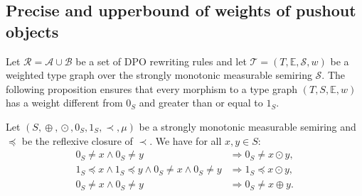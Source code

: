 \subsection{Precise and upperbound of weights of pushout objects}
Let \( \mathcal{R} \mathop{=} \mathcal{A} \mathop{\cup} \mathcal{B} \) be a set of DPO rewriting rules and let \(\mathcal{T} \mathop{=} (T, \mathbb{E}, \mathcal{S}, w)\) be a weighted type graph over the strongly monotonic measurable semiring $\mathcal{S}$.
The following proposition ensures that every morphism to a type graph $(T,S,\mathbb{E}, w)$ has a weight different from $0_S$ and greater than or equal to $1_S$.
\begin{proposition}  
    \label{prop_endrullis_2d7}
    Let $(S, \mathop{\oplus}, \mathop{\odot}, 0_S, 1_S, \prec, \mu)$ be a strongly monotonic measurable semiring and $\mathop{\preceq}$ be the reflexive closure of $\prec$. We have for all $x,y\in S$:
    \begin{align*}
        0_S \mathop{\neq} x \mathop{\land} 0_S \mathop{\neq} y 
        &\mathop{\Rightarrow} 0_S \mathop{\neq} x \mathop{\odot} y,
        \tag{S10} \label{eq:prop_neq0_mul_neq0}  
        \\
        1_S \mathop{\preceq} x \mathop{\land} 1_S \mathop{\preceq} y \mathop{\land} 0_S \mathop{\neq} x \mathop{\land} 0_S \mathop{\neq} y  
        &\mathop{\Rightarrow}
         1_S \mathop{\preceq} x \mathop{\odot} y,
         \tag{S11} \label{eq:prop_neg0_ge1_mul_ge1}  
         \\
         0_S \mathop{\neq} x \mathop{\land} 0_S \mathop{\neq} y   
         &\mathop{\Rightarrow} 0_S \mathop{\neq} x \mathop{\oplus} y.
         \tag{S12} \label{eq:prop_neq0_plus_neq0}  
    \end{align*}
\end{proposition}

